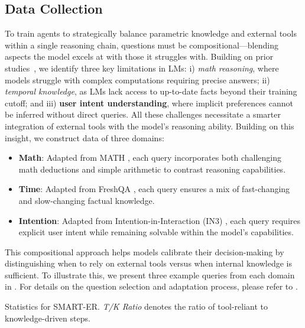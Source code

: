 \subsection{Data Collection}
To train agents to strategically balance parametric knowledge and external tools within a single reasoning chain, questions must be compositional—blending aspects the model excels at with those it struggles with. Building on prior studies~\citep{hendrycks2021measuring, vu2023freshllms, qian2024tell}, we identify three key limitations in LMs: i) \textit{math reasoning}, where models struggle with complex computations requiring precise answers; ii) \textit{temporal knowledge}, as LMs lack access to up-to-date facts beyond their training cutoff; and iii) \textbf{user intent understanding}, where implicit preferences cannot be inferred without direct queries.
All these challenges necessitate a smarter integration of external tools with the model’s reasoning ability. Building on this insight, we construct data of three domains: 
\begin{itemize}[topsep=2pt, partopsep=-5pt, leftmargin=8pt, itemsep=-4.5pt]
\item \textbf{Math}: Adapted from MATH \citep{hendrycks2021measuring}, each query incorporates both challenging math deductions and simple arithmetic to contrast reasoning capabilities.
\item \textbf{Time}: Adapted from FreshQA \citep{vu2023freshllms}, each query ensures a mix of fast-changing and slow-changing factual knowledge.
\item \textbf{Intention}: Adapted from Intention-in-Interaction (IN3) \citep{qian2024tell}, each query requires explicit user intent while remaining solvable within the model’s capabilities.
\end{itemize}
This compositional approach helps models calibrate their decision-making by distinguishing when to rely on external tools versus when internal knowledge is sufficient. To illustrate this, we present three example queries from each domain in . For details on the question selection and adaptation process, please refer to .

\begin{table}[!t]
    \centering
    \caption{Statistics for SMART-ER. \textit{T/K Ratio} denotes the ratio of tool-reliant to knowledge-driven steps.}
    \label{tab:data_statistic}
\end{table}

